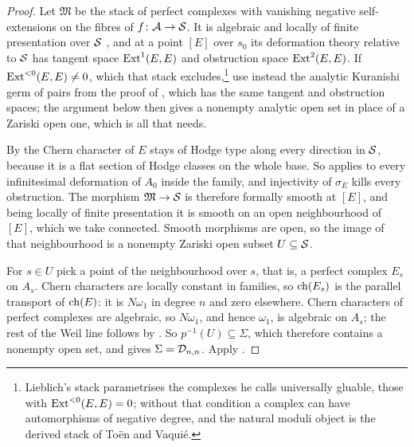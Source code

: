 \begin{proof}
Let $\mathfrak{M}$ be the stack of perfect complexes with vanishing negative
self-extensions on the fibres of $f\colon\mathcal{A}\to\mathcal{S}$. It is algebraic and
locally of finite presentation over $\mathcal{S}$ \cite{Lie06}, and at a point $[E]$
over $s_{0}$ its deformation theory relative to $\mathcal{S}$ has tangent space
$\operatorname{Ext}^{1}(E,E)$ and obstruction space $\operatorname{Ext}^{2}(E,E)$. If
$\operatorname{Ext}^{<0}(E,E)\ne0$, which that stack excludes,\footnote{Lieblich's
stack parametrises the complexes he calls universally gluable, those with
$\operatorname{Ext}^{<0}(E,E)=0$; without that condition a complex can have automorphisms
of negative degree, and the natural moduli object is the derived stack of
To\"en and Vaqui\'e.} use instead the analytic Kuranishi germ of pairs from
the proof of , which has the same tangent and obstruction
spaces; the argument below then gives a nonempty analytic open set in place of
a Zariski open one, which is all that \cite[Corollary~16.5]{paperI} needs.

By  the Chern character of $E$ stays of Hodge type along
every direction in $\mathcal{S}$, because it is a flat section of Hodge classes on the
whole base. So  applies to every infinitesimal deformation of
$A_{0}$ inside the family, and injectivity of $\sigma_{E}$ kills every
obstruction. The morphism $\mathfrak{M}\to\mathcal{S}$ is therefore formally smooth at
$[E]$, and being locally of finite presentation it is smooth on an open
neighbourhood of $[E]$, which we take connected. Smooth morphisms are open,
so the image of that neighbourhood is a nonempty Zariski open subset
$U\subseteq\mathcal{S}$.

For $s\in U$ pick a point of the neighbourhood over $s$, that is, a perfect
complex $E_{s}$ on $A_{s}$. Chern characters are locally constant in
families, so $\operatorname{ch}(E_{s})$ is the parallel transport of $\operatorname{ch}(E)$: it is
$N\omega_{1}$ in degree $n$ and zero elsewhere. Chern characters of perfect
complexes are algebraic, so $N\omega_{1}$, and hence $\omega_{1}$, is
algebraic on $A_{s}$; the rest of the Weil line follows by
\cite[Lemma~16.3]{paperI}. So $p^{-1}(U)\subseteq\Sigma$, which therefore
contains a nonempty open set, and \cite[Corollary~16.5]{paperI} gives
$\Sigma=\mathcal{D}_{n,n}$. Apply \cite[Theorem~15.14(a)]{paperI}.
\end{proof}

